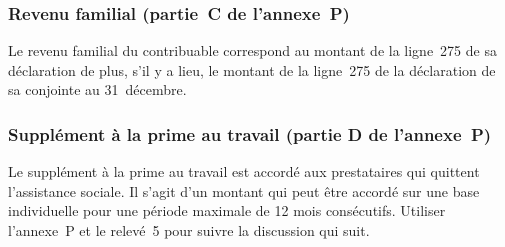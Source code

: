 \subsubsection{Revenu familial (partie~C de l'annexe~P)}
Le revenu familial du contribuable correspond au montant de la ligne~275 de sa déclaration de plus, s'il y a lieu, le montant de la ligne~275 de la déclaration de sa conjointe au 31~décembre.

\subsubsection{Supplément à la prime au travail (partie D de l'annexe~P)}
Le supplément à la prime au travail est accordé aux prestataires qui quittent l'assistance sociale. Il s'agit d'un montant qui peut être accordé sur une base individuelle pour une période maximale de 12 mois consécutifs. Utiliser l'annexe~P et le relevé~5 pour suivre la discussion qui suit.

